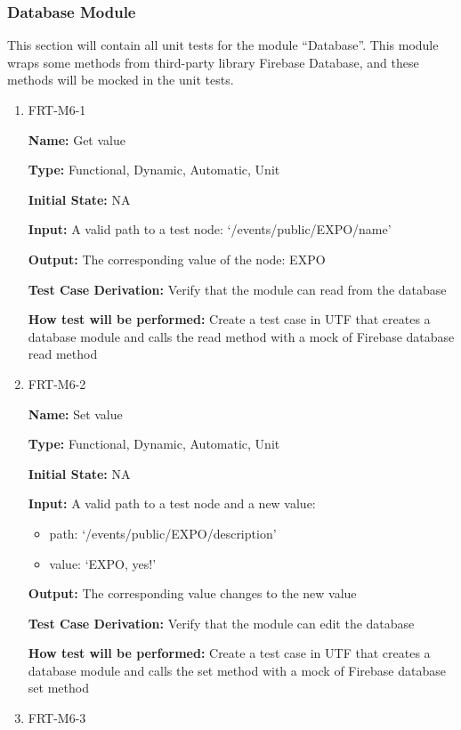 \documentclass[12pt, titlepage]{article}
\begin{document}
\subsubsection{Database Module}

This section will contain all unit tests for the module ``Database''.  This module wraps some methods from third-party library Firebase Database, and these methods will be mocked in the unit tests.

\begin{enumerate}
\item{FRT-M6-1}

\textbf{Name:} Get value

\textbf{Type:} Functional, Dynamic, Automatic, Unit
					
\textbf{Initial State:} NA
					
\textbf{Input:} A valid path to a test node: `/events/public/EXPO/name'
					
\textbf{Output:} The corresponding value of the node: EXPO

\textbf{Test Case Derivation:} Verify that the module can read from the database

\textbf{How test will be performed:} Create a test case in UTF that creates a database module and calls the read method with a mock of Firebase database read method

\item{FRT-M6-2}

\textbf{Name:} Set value

\textbf{Type:} Functional, Dynamic, Automatic, Unit
					
\textbf{Initial State:} NA
					
\textbf{Input:} A valid path to a test node and a new value: 
\begin{itemize}
\item path: `/events/public/EXPO/description'
\item value: `EXPO, yes!'
\end{itemize}

\textbf{Output:} The corresponding value changes to the new value

\textbf{Test Case Derivation:} Verify that the module can edit the database

\textbf{How test will be performed:} Create a test case in UTF that creates a database module and calls the set method with a mock of Firebase database set method

\item{FRT-M6-3}


\end{enumerate}
\end{document}
